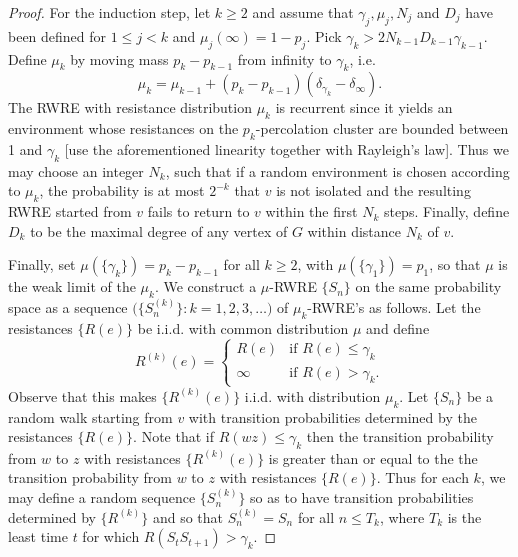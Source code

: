 \documentclass[11pt]{article}
\begin{document}
\begin{proof}
For the induction step, let $k\geq2$ and assume that $\gamma_j,\mu_j,N_j$
and $D_j$ have been defined for $1\leq j<k$ and $\mu_j(\infty)=1-p_j$.
Pick $\gamma_k>2N_{k-1}D_{k-1}\gamma_{k-1}$. Define $\mu_k$ by moving mass
$p_k-p_{k-1}$ from infinity to $\gamma_k$, i.e.
\[
\mu_k=\mu_{k-1}+(p_k-p_{k-1})(\delta_{\gamma_k}-\delta_\infty).
\]
The RWRE with resistance distribution $\mu_k$ is recurrent since it yields
an environment whose resistances on the $p_k$-percolation cluster are
bounded between 1 and $\gamma_k$ [use the aforementioned linearity together
with Rayleigh's law]. Thus we may choose an integer $N_k$, such that if a
random environment is chosen according to $\mu_k$, the probability is at
most $2^{-k}$ that $v$ is not isolated and the resulting RWRE started from
$v$ fails to return to $v$ within the first $N_k$ steps. Finally, define
$D_k$ to be the maximal degree of any vertex of $G$ within distance $N_k$ of $v$.

Finally, set $\mu(\{\gamma_k\})=p_k-p_{k-1}$ for all $k\geq2$, with
$\mu(\{\gamma_1\})=p_1$, so that $\mu$ is the weak limit of the $\mu_k$.
We construct a $\mu$-RWRE $\{S_n\}$ on the same probability space as a
sequence $\bigl(\{S_n^{(k)}\}:k=1,2,3,\ldots\bigr)$ of $\mu_k$-RWRE's
as follows. Let the resistances $\{R(e)\}$ be i.i.d. with common distribution
$\mu$ and define
\[
R^{(k)}(e)=\begin{cases}R(e)&\text{if }R(e)\leq\gamma_k\\
\infty&\text{if }R(e)>\gamma_k.\end{cases}
\]
Observe that this makes $\{R^{(k)}(e)\}$ i.i.d. with distribution $\mu_k$.
Let $\{S_n\}$ be a random walk starting from $v$ with transition
probabilities determined by the resistances $\{R(e)\}$. Note that if
$R(wz)\leq\gamma_k$ then the transition probability from $w$ to $z$ with
resistances $\{R^{(k)}(e)\}$ is greater than or equal to the the transition
probability from $w$ to $z$ with resistances $\{R(e)\}$. Thus for each $k$,
we may define a random sequence $\{S_n^{(k)}\}$ so as to have transition
probabilities determined by $\{R^{(k)}\}$ and so that $S_n^{(k)}=S_n$ for
all $n\leq T_k$, where $T_k$ is the least time $t$ for which
$R(S_tS_{t+1})>\gamma_k$.


\end{proof}
\end{document}
